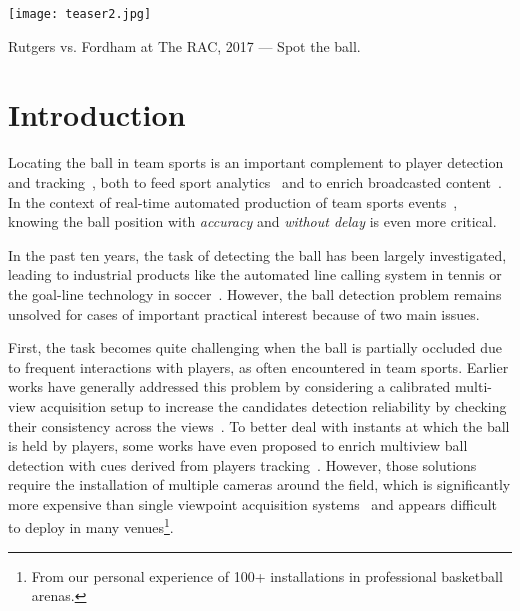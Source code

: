 \documentclass[sigconf, screen]{acmart}
\begin{document}

\begin{teaserfigure}
\texttt{[image: teaser2.jpg]}
\caption{Rutgers vs. Fordham at The RAC, 2017 --- Spot the ball.}
\label{fig:teaser}
\end{teaserfigure}

\maketitle

\section{Introduction}
\label{sec:intro}

Locating the ball in team sports is an important complement to player detection~\cite{Parisot2017} and tracking~\cite{Kumar2013a}, both to feed sport analytics~\cite{Thomas2017a} and to enrich broadcasted content~\cite{Fernandez2010}.
In the context of real-time automated production of team sports events~\cite{Chen2011,Chen2010d,Chen2010c,Chen2016a,Keemotion}, knowing the ball position with \emph{accuracy} and \emph{without delay} is even more critical.

In the past ten years, the task of detecting the ball has been largely investigated, leading to industrial products like the automated line calling system in tennis or the goal-line technology in soccer~\cite{HawkEye}. However, the ball detection problem remains unsolved for cases of important practical interest because of two main issues.

First, the task becomes quite challenging when the ball is partially occluded due to frequent interactions with players, as often encountered in team sports. Earlier works have generally addressed this problem by considering a calibrated multi-view acquisition setup to increase the candidates detection reliability by checking their consistency across the views~\cite{Parisot2011, Ren2008, intelTrueView, HawkEye, Lampert2012}. To better deal with instants at which the ball is held by players, some works have even proposed to enrich multiview ball detection with cues derived from players tracking~\cite{Wang2014a, Wang2014, Maksai2016}. However, those solutions require the installation of multiple cameras around the field, which is significantly more expensive than single viewpoint acquisition systems~\cite{intelTrueView} and appears difficult to deploy in many venues\footnote{From our personal experience of 100+ installations in professional basketball arenas.}.
\end{document}
